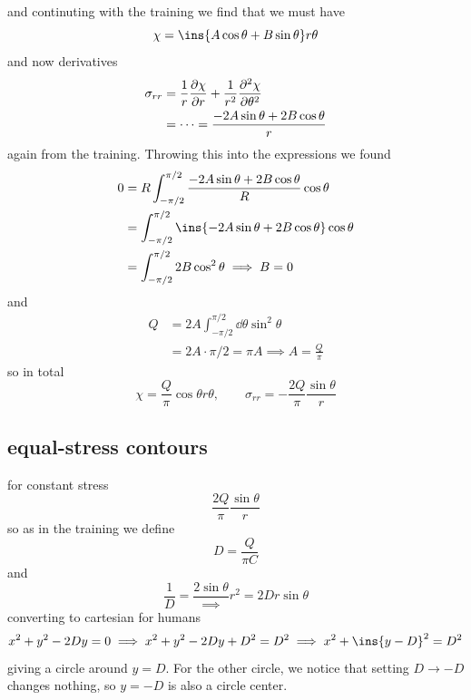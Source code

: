 and continuting with the training we find that we must have 
\begin{equation}
	\chi = \ins{A\cos\theta+B\sin\theta}r\theta
\end{equation}
and now derivatives 
\begin{align}
	\sigma_{rr} &= \frac{1}{r}\pdv{\chi}{r}+\frac{1}{r^2}\pdv[2]{\chi}{\theta}\\
	&= \cdots = \frac{-2A\sin\theta+2B\cos\theta}{r}
\end{align}
again from the training. Throwing this into the expressions we found
\begin{align}
	0&=R\int_{-\pi/2}^{\pi/2}\frac{-2A\sin\theta+2B\cos\theta}{R}\cos\theta\\
	&= \int_{-\pi/2}^{\pi/2}\ins{-2A\sin\theta+2B\cos\theta}\cos\theta\\
	&= \int_{-\pi/2}^{\pi/2}2B\cos^2\theta \implies B=0
\end{align}
and 
\begin{align}
	Q &= 2A\int_{-\pi/2}^{\pi/2}\dd{\theta}\sin^2\theta\\
	&= 2A\cdot\pi/2=\pi A\implies A=\frac{Q}{\pi}
\end{align}
so in total
\begin{equation}
	\chi = \frac{Q}{\pi}\cos\theta r\theta, \qquad \sigma_{rr}=-\frac{2Q}{\pi}\frac{\sin\theta}{r}
\end{equation}
\subsection{equal-stress contours}
for constant stress 
\begin{equation}
	\frac{2Q}{\pi}\frac{\sin\theta}{r}
\end{equation}
so as in the training we define 
\begin{equation}
	D=\frac{Q}{\pi C}
\end{equation}
and 
\begin{equation}
	\frac{1}{D}=\frac{2\sin\theta} \implies r^2=2Dr\sin\theta
\end{equation}
converting to cartesian for humans 
\begin{equation}
	x^2+y^2-2Dy=0 \implies x^2+y^2-2Dy+D^2=D^2 \implies x^2+\ins{y-D}^2=D^2
\end{equation}
giving a circle around \(y=D\). For the other circle, we notice that setting \(D\to-D\) changes nothing, so \(y=-D\) is also a circle center.
